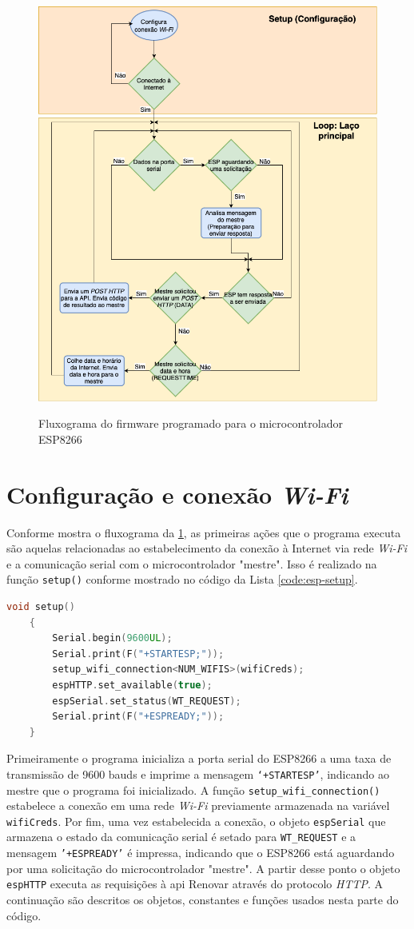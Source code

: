 \begin{figure}[h]
    \centering
    \caption{Fluxograma do firmware programado para o microcontrolador ESP8266}
    \includegraphics[width=0.5\linewidth]{aftertext//Firmware ESP8266/Figuras/ESP8266 Main flowchart (PT).png}
    \label{fig:fw-esp-main-flow}
\end{figure}

\section{Configuração e conexão \textit{Wi-Fi}}

Conforme mostra o fluxograma da \ref{fig:fw-esp-main-flow}, as primeiras ações que o programa executa são aquelas relacionadas ao estabelecimento da conexão à Internet via rede \textit{Wi-Fi} e a comunicação serial com o microcontrolador "mestre". Isso é realizado na função \texttt{setup()} conforme mostrado no código da Lista \ref{code:esp-setup}.

\begin{lstlisting}[language=C++, caption=Definição dos identificadores dos sensores de um dispositivo]
    void setup() 
    {
        Serial.begin(9600UL);
        Serial.print(F("+STARTESP;"));
        setup_wifi_connection<NUM_WIFIS>(wifiCreds);
        espHTTP.set_available(true);
        espSerial.set_status(WT_REQUEST);
        Serial.print(F("+ESPREADY;"));
    }
\end{lstlisting}
\label{code:esp-setup}

Primeiramente o programa inicializa a porta serial do ESP8266 a uma taxa de transmissão de 9600 bauds e imprime a mensagem \texttt{‘+STARTESP’}, indicando ao mestre que o programa foi inicializado. A função \texttt{setup\_wifi\_connection()} estabelece a conexão em uma rede \textit{Wi-Fi} previamente armazenada na variável \texttt{wifiCreds}. Por fim, uma vez estabelecida a conexão, o objeto \texttt{espSerial} que armazena o estado da comunicação serial é setado para \texttt{WT\_REQUEST} e a mensagem \texttt{'+ESPREADY'} é impressa, indicando que o ESP8266 está aguardando por uma solicitação do microcontrolador "mestre". A partir desse ponto o objeto \texttt{espHTTP} executa as requisições à \acrshort*{api} Renovar através do protocolo \textit{HTTP}. A continuação são descritos os objetos, constantes e funções usados nesta parte do código.

